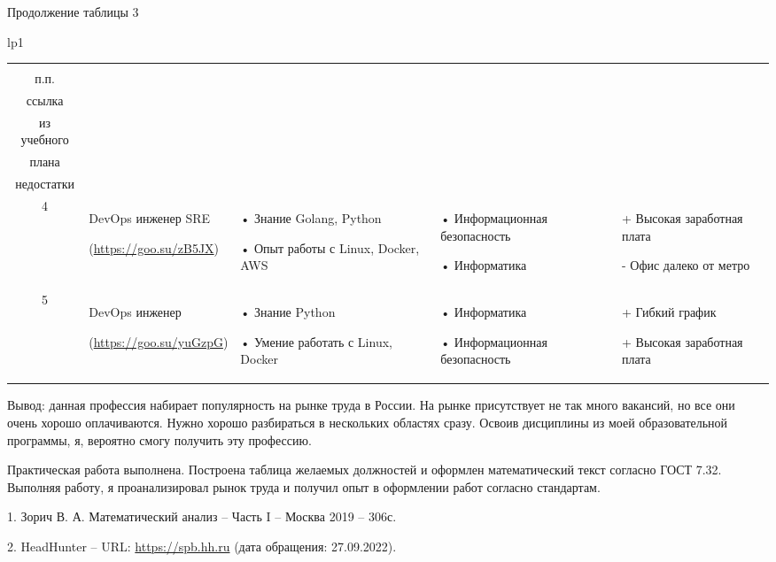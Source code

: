 \documentclass[14pt]{extreport}
\begin{document}
\begin{landscape}
\newpage
Продолжение таблицы 3
\begin{longtable}[H]{lp{1\linewidth}}
\caption{Продолжение таблицы 3}

\centering

\begin{small}


    \begin{tabular}{|c|p{}|p{6cm}|p{5cm}|p{5cm}|}
	\hline 
	\makecell{№ \\ п.п.} &	\makecell{Название должности,\\  ссылка} &	\makecell{Требования} & 	\makecell{Дисциплины \\ из учебного \\плана} &	\makecell{Преимущества и \\недостатки}  \\ 
	\hline 
	4	& DevOps инженер SRE 
	
(\url{https://goo.su/zB5JX}) &
•	Знание Golang, Python

•	Опыт работы с Linux, Docker, AWS &
•	Информационная безопасность

•	Информатика &
+	Высокая заработная плата

-	Офис далеко от метро
\\



	\hline
	5	& DevOps инженер 
	
(\url{https://goo.su/yuGzpG}) &
•	Знание Python

•	Умение работать с Linux, Docker
	&
•	Информатика

• Информационная безопасность & 
+	Гибкий график
 
+	Высокая заработная плата 
\\

	\hline 


    \end{tabular}
    \end{small}
\end{longtable}

Вывод: данная профессия набирает популярность на рынке труда в России. На рынке присутствует не так много вакансий, но все они очень хорошо оплачиваются. Нужно хорошо разбираться в нескольких областях сразу. Освоив дисциплины из моей образовательной программы, я, вероятно смогу получить эту профессию.
\end{landscape}



\conclusions

Практическая работа выполнена. Построена таблица желаемых должностей и оформлен математический текст согласно ГОСТ 7.32. Выполняя работу, я проанализировал рынок труда и получил опыт в оформлении работ согласно стандартам.



\newpage
\begin{thebibliography}{99}
 1.	Зорич В. А. Математический анализ – Часть I – Москва 2019 – 306с.

 2.	HeadHunter – URL: \url{https://spb.hh.ru} (дата обращения: 27.09.2022).
\end{thebibliography}
\end{document}
